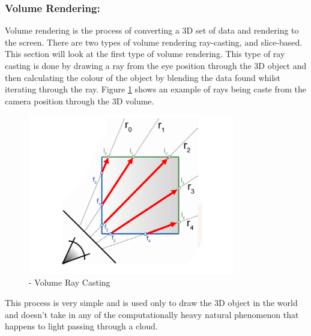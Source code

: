 \subsubsection{Volume Rendering:}
\label{sec:vr}

Volume rendering is the process of converting a 3D set of data and rendering to the screen.
There are two types of volume rendering ray-casting, and slice-based.
This section will look at the first type of volume rendering.
This type of ray casting is done by drawing a ray from the eye position through the 3D object and then calculating the colour of the object by blending the data found whilst iterating through the ray.
Figure \ref{fig:ray_casting2} shows an example of rays being caste from the camera position through the 3D volume.

\begin{figure}[ht!]
	\centering
	\includegraphics[width=90mm]{images/ray_thumb.PNG}
	\caption{\cite{KHayward09} - Volume Ray Casting}
	\label{fig:ray_casting2}
\end{figure}

This process is very simple and is used only to draw the 3D object in the world and doesn't take in any of the computationally heavy natural phenomenon that happens to light passing through a cloud.